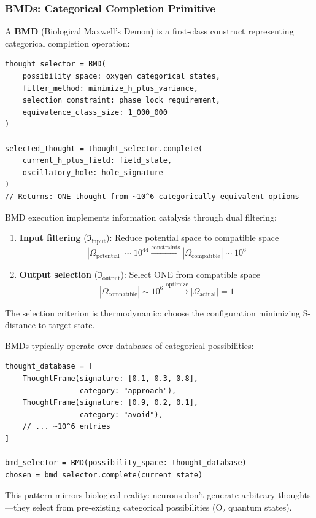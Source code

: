 \subsubsection{BMDs: Categorical Completion Primitive}

\begin{definition}
A \textbf{BMD} (Biological Maxwell's Demon) is a first-class construct representing categorical completion operation:
\begin{verbatim}
thought_selector = BMD(
    possibility_space: oxygen_categorical_states,
    filter_method: minimize_h_plus_variance,
    selection_constraint: phase_lock_requirement,
    equivalence_class_size: 1_000_000
)

selected_thought = thought_selector.complete(
    current_h_plus_field: field_state,
    oscillatory_hole: hole_signature
)
// Returns: ONE thought from ~10^6 categorically equivalent options
\end{verbatim}
\end{definition}

\begin{theorem}
\label{thm:bmd_semantics}
BMD execution implements information catalysis through dual filtering:

\begin{enumerate}
\item \textbf{Input filtering} ($\Im_{\text{input}}$): Reduce potential space to compatible space
\begin{equation}
|\Omega_{\text{potential}}| \sim 10^{44} \xrightarrow{\text{constraints}} |\Omega_{\text{compatible}}| \sim 10^6
\end{equation}

\item \textbf{Output selection} ($\Im_{\text{output}}$): Select ONE from compatible space
\begin{equation}
|\Omega_{\text{compatible}}| \sim 10^6 \xrightarrow{\text{optimize}} |\Omega_{\text{actual}}| = 1
\end{equation}
\end{enumerate}

The selection criterion is thermodynamic: choose the configuration minimizing S-distance to target state.
\end{theorem}

\begin{proposition}
BMDs typically operate over databases of categorical possibilities:
\begin{verbatim}
thought_database = [
    ThoughtFrame(signature: [0.1, 0.3, 0.8],
                 category: "approach"),
    ThoughtFrame(signature: [0.9, 0.2, 0.1],
                 category: "avoid"),
    // ... ~10^6 entries
]

bmd_selector = BMD(possibility_space: thought_database)
chosen = bmd_selector.complete(current_state)
\end{verbatim}

This pattern mirrors biological reality: neurons don't generate arbitrary thoughts—they select from pre-existing categorical possibilities (O₂ quantum states).
\end{proposition}

